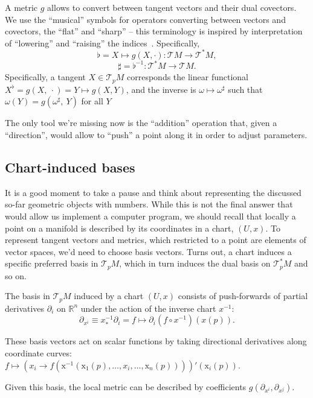 A metric \( g \) allows to convert between tangent vectors and their dual
covectors.
We use the ``musical'' symbols for operators
converting between vectors and covectors, the ``flat'' and ``sharp'' -- this
terminology is inspired by interpretation of ``lowering'' and ``raising''
the indices~\cite{leeRiem}. Specifically,
\[ \flat = X \mapsto g(X, \cdot): \mathcal{T}M\to \mathcal{T}^*M, \]
\[ \sharp = \flat^{-1} : \mathcal{T}^*M \to \mathcal{T}M. \]
Specifically, a tangent \( X\in\mathcal{T}_p M\) corresponds the linear
functional \( X^\flat = g(X,~\cdot) = Y \mapsto g(X, Y) \), and the inverse is \(
\omega\mapsto \omega^{\sharp} \) such that \( \omega(Y) =
g\left(\omega^{\sharp},~Y\right) \) for all \( Y \)

The only tool we're missing now is the ``addition'' operation that, given a
``direction'', would allow to ``push'' a point along it in order to adjust
parameters. 

\subsection*{Chart-induced bases} \label{sec:chartInducedBasis}

It is a good moment to take a pause and think about representing the discussed
so-far geometric objects with numbers. While this is not the final answer that
would allow us implement a computer program, we should recall that locally a
point on a manifold is described by its coordinates in a chart, \( (U, x) \).
To represent tangent vectors and metrics, which restricted to a point are
elements of vector spaces, we'd need to choose basis vectors. Turns out,
a chart induces a specific preferred basis in \( \mathcal{T}_pM \),
which in turn induces the dual basis on \( \mathcal{T}^*_pM \) and so on.

The basis in \( \mathcal{T}_pM \) induced by a chart \( (U, x) \) consists of
push-forwards of partial derivatives \( \partial_i \) on \(\mathbb{R}^n\) under
the action of the inverse chart \( x^{-1} \):
\[ \partial_{x^i} \equiv x^{-1}_*\partial_i = f\mapsto \partial_i (f \circ x^{-1})(x(p)). \]

These basis vectors act on scalar functions by taking directional derivatives
along coordinate curves: \( f \mapsto \left(x_i \to
f\left(\mathrm{x}^{-1}\left(\mathrm{x}_1(p), \ldots, x_i, \ldots,
\mathrm{x}_n(p)\right)\right)\right)'(\mathrm{x}_i(p)). \)

Given this basis, the local metric can be described by coefficients
\( g(\partial_{x^i}, \partial_{x^j}) \).

